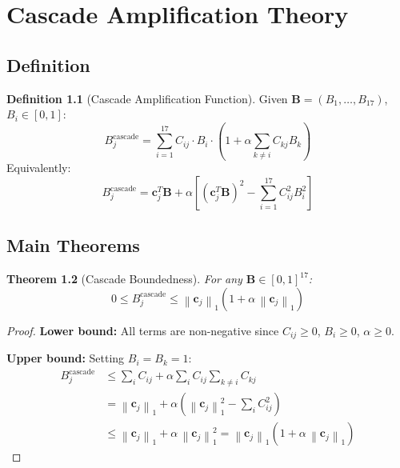 \documentclass[12pt,a4paper]{report}
\theoremstyle{plain}
\newtheorem{theorem}{Theorem}[chapter]
\theoremstyle{definition}
\newtheorem{definition}[theorem]{Definition}
\theoremstyle{remark}
\newcommand{\biasvec}{\mathbf{B}}
\newcommand{\casc}{^{\text{cascade}}}
\newcommand{\norm}[1]{\left\|#1\right\|}
\begin{document}
\chapter{Cascade Amplification Theory}
\label{ch:cascade}

\section{Definition}

\begin{definition}[Cascade Amplification Function]
\label{def:cascade}
Given $\biasvec = (B_1,\ldots,B_{17})$, $B_i \in [0,1]$:
\begin{equation}
    B_j\casc = \sum_{i=1}^{17} C_{ij} \cdot B_i \cdot
    \left(1 + \alpha \sum_{k \neq i} C_{kj} B_k\right)
\end{equation}
Equivalently:
\begin{equation}
    B_j\casc = \mathbf{c}_j^T \biasvec
    + \alpha\left[
      \left(\mathbf{c}_j^T \biasvec\right)^2
      - \sum_{i=1}^{17} C_{ij}^2 B_i^2
      \right]
\end{equation}
\end{definition}

\section{Main Theorems}

\begin{theorem}[Cascade Boundedness]
\label{thm:cascade-bound}
For any $\biasvec \in [0,1]^{17}$:
\begin{equation}
    0 \leq B_j\casc
    \leq \norm{\mathbf{c}_j}_1
         \left(1 + \alpha\, \norm{\mathbf{c}_j}_1\right)
\end{equation}
\end{theorem}
\begin{proof}
\textbf{Lower bound:} All terms are non-negative since
$C_{ij} \geq 0$, $B_i \geq 0$, $\alpha \geq 0$.

\textbf{Upper bound:} Setting $B_i = B_k = 1$:
\begin{align*}
    B_j\casc
    &\leq \sum_{i} C_{ij}
    + \alpha \sum_{i} C_{ij} \sum_{k \neq i} C_{kj}\\
    &= \norm{\mathbf{c}_j}_1
    + \alpha\left(\norm{\mathbf{c}_j}_1^2
      - \sum_i C_{ij}^2\right)\\
    &\leq \norm{\mathbf{c}_j}_1
    + \alpha\, \norm{\mathbf{c}_j}_1^2
    = \norm{\mathbf{c}_j}_1
      \left(1 + \alpha\, \norm{\mathbf{c}_j}_1\right)
\end{align*}
\end{proof}
\end{document}
